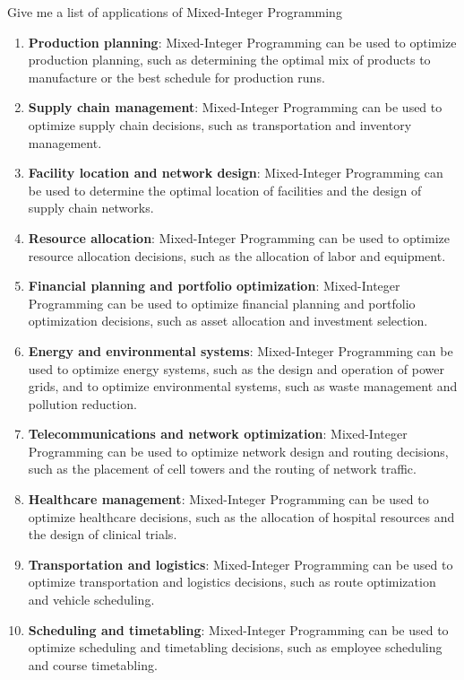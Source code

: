 \newpage


\begin{bclogo}[logo=\bcvaletcoeur]{\small \vspace{.2cm} Give me a list of applications of Mixed-Integer Programming}
\vspace{.2cm}

\footnotesize

\begin{enumerate}
\item \textbf{Production planning}: Mixed-Integer Programming can be used to optimize production planning, such as determining the optimal mix of products to manufacture or the best schedule for production runs.
\item \textbf{Supply chain management}: Mixed-Integer Programming can be used to optimize supply chain decisions, such as transportation and inventory management.
\item \textbf{Facility location and network design}: Mixed-Integer Programming can be used to determine the optimal location of facilities and the design of supply chain networks.
\item \textbf{Resource allocation}: Mixed-Integer Programming can be used to optimize resource allocation decisions, such as the allocation of labor and equipment.
\item \textbf{Financial planning and portfolio optimization}: Mixed-Integer Programming can be used to optimize financial planning and portfolio optimization decisions, such as asset allocation and investment selection.
\item \textbf{Energy and environmental systems}: Mixed-Integer Programming can be used to optimize energy systems, such as the design and operation of power grids, and to optimize environmental systems, such as waste management and pollution reduction.
\item \textbf{Telecommunications and network optimization}: Mixed-Integer Programming can be used to optimize network design and routing decisions, such as the placement of cell towers and the routing of network traffic.
\item \textbf{Healthcare management}: Mixed-Integer Programming can be used to optimize healthcare decisions, such as the allocation of hospital resources and the design of clinical trials.
\item \textbf{Transportation and logistics}: Mixed-Integer Programming can be used to optimize transportation and logistics decisions, such as route optimization and vehicle scheduling.
\item \textbf{Scheduling and timetabling}: Mixed-Integer Programming can be used to optimize scheduling and timetabling decisions, such as employee scheduling and course timetabling.
\end{enumerate}

\vspace{.2cm}
\end{bclogo}
\vspace{1cm}


